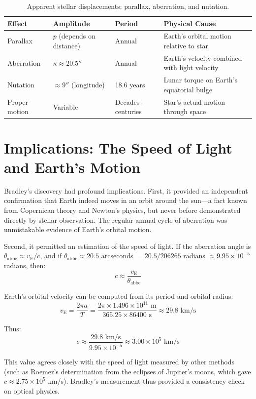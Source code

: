 \begin{table}[htbp]
  \centering
  \caption{Apparent stellar displacements: parallax, aberration, and nutation.}
  \label{tab:stellar-displacements}
  \small
  \begin{tabularx}{\linewidth}{lXlX}
    \toprule
    \textbf{Effect} & \textbf{Amplitude} & \textbf{Period} & \textbf{Physical Cause} \\
    \midrule
    Parallax & $p$ (depends on distance) & Annual & Earth's orbital motion relative to star \\
    Aberration & $\kappa \approx 20.5''$ & Annual & Earth's velocity combined with light velocity \\
    Nutation & $\approx 9''$ (longitude) & 18.6 years & Lunar torque on Earth's equatorial bulge \\
    Proper motion & Variable & Decades--centuries & Star's actual motion through space \\
    \bottomrule
  \end{tabularx}
\end{table}

\section{Implications: The Speed of Light and Earth's Motion}

Bradley's discovery had profound implications. First, it provided an independent confirmation that Earth indeed moves in an orbit around the sun—a fact known from Copernican theory and Newton's physics, but never before demonstrated directly by stellar observation. The regular annual cycle of aberration was unmistakable evidence of Earth's orbital motion.

Second, it permitted an estimation of the speed of light. If the aberration angle is $\theta_{\text{abbe}} \approx v_{\text{E}} / c$, and if $\theta_{\text{abbe}} \approx 20.5$ arcseconds $= 20.5 / 206265$ radians $\approx 9.95 \times 10^{-5}$ radians, then:
\[
  c \approx \frac{v_{\text{E}}}{\theta_{\text{abbe}}}
\]

Earth's orbital velocity can be computed from its period and orbital radius:
\[
  v_{\text{E}} = \frac{2\pi a}{T} = \frac{2\pi \times 1.496 \times 10^{11} \text{ m}}{365.25 \times 86400 \text{ s}} \approx 29.8 \text{ km/s}
\]

Thus:
\[
  c \approx \frac{29.8 \text{ km/s}}{9.95 \times 10^{-5}} \approx 3.00 \times 10^5 \text{ km/s}
\]

This value agrees closely with the speed of light measured by other methods (such as Roemer's determination from the eclipses of Jupiter's moons, which gave $c \approx 2.75 \times 10^5$ km/s). Bradley's measurement thus provided a consistency check on optical physics.

